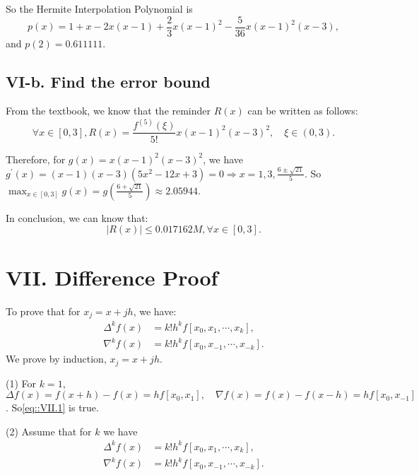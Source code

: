\documentclass[a4paper]{article}
\begin{document}
So the Hermite Interpolation Polynomial is
\begin{equation}
  p(x) = 1 + x - 2x(x-1) + \frac{2}{3}x(x-1)^2 - \frac{5}{36}x(x-1)^2(x-3),
\end{equation}
and $p(2) = 0.611111$. 

\subsection*{VI-b. Find the error bound}
From the textbook, we know that the reminder $R(x)$ can be written as follows:
\begin{equation}
  \forall x \in [0,3], R(x) = \frac{f^{(5)} (\xi)}{5!} x(x-1)^2(x-3)^2, \quad \xi \in (0,3).
\end{equation}

Therefore, for $g(x) = x(x-1)^2(x-3)^2$, we have $g^{\prime}(x)=(x-1)(x-3)(5x^2-12x+3) = 0 \Rightarrow x=1,3,\frac{6\pm \sqrt{21}}{5}$. So $\max_{x\in[0,3]} g(x) = g(\frac{6+\sqrt{21}}{5}) \approx 2.05944$. 

In conclusion, we can know that:
\begin{equation}
  \vert R(x)\vert \leq 0.017162 M, \forall x \in [0,3].
\end{equation}

\section*{VII. Difference Proof}
To prove that for $x_j = x+jh$, we have:
\begin{equation}
  \begin{aligned}
    \Delta^k f(x) &= k! h^k f[x_0, x_1, \cdots, x_k],\\
    \nabla^k f(x) &= k! h^{k} f[x_0, x_{-1}, \cdots, x_{-k}].
  \end{aligned}
  \label{eq::VII.1}
\end{equation}
We prove by induction, $x_j = x+jh$.

(1) For $k=1$, $\Delta f(x) = f(x+h) - f(x) = h f[x_0, x_1],\quad \nabla f(x) = f(x) - f(x-h) = h f[x_0, x_{-1}]$. So\eqref{eq::VII.1} is true.

(2) Assume that for $k$ we have 
\begin{equation}
  \begin{aligned}
    \Delta^k f(x) &= k! h^k f[x_0, x_1, \cdots, x_k],\\
    \nabla^k f(x) &= k! h^{k} f[x_0, x_{-1}, \cdots, x_{-k}].
  \end{aligned}
\end{equation}
\end{document}
